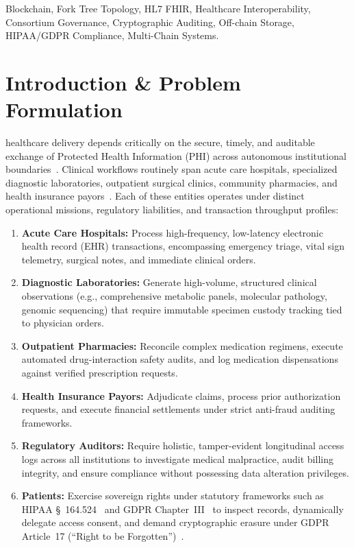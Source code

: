 \documentclass[journal]{IEEEtran}
\theoremstyle{definition}
\begin{document}
\begin{IEEEkeywords}
Blockchain, Fork Tree Topology, HL7 FHIR, Healthcare Interoperability, Consortium Governance, Cryptographic Auditing, Off-chain Storage, HIPAA/GDPR Compliance, Multi-Chain Systems.
\end{IEEEkeywords}

\section{Introduction \& Problem Formulation}
 healthcare delivery depends critically on the secure, timely, and auditable exchange of Protected Health Information (PHI) across autonomous institutional boundaries~\cite{kuo2017blockchain, gordon2018blockchain}. Clinical workflows routinely span acute care hospitals, specialized diagnostic laboratories, outpatient surgical clinics, community pharmacies, and health insurance payors~\cite{mandl2016push, vogel2021interoperability}. Each of these entities operates under distinct operational missions, regulatory liabilities, and transaction throughput profiles:
\begin{enumerate}
    \item \textbf{Acute Care Hospitals:} Process high-frequency, low-latency electronic health record (EHR) transactions, encompassing emergency triage, vital sign telemetry, surgical notes, and immediate clinical orders.
    \item \textbf{Diagnostic Laboratories:} Generate high-volume, structured clinical observations (e.g., comprehensive metabolic panels, molecular pathology, genomic sequencing) that require immutable specimen custody tracking tied to physician orders.
    \item \textbf{Outpatient Pharmacies:} Reconcile complex medication regimens, execute automated drug-interaction safety audits, and log medication dispensations against verified prescription requests.
    \item \textbf{Health Insurance Payors:} Adjudicate claims, process prior authorization requests, and execute financial settlements under strict anti-fraud auditing frameworks.
    \item \textbf{Regulatory Auditors:} Require holistic, tamper-evident longitudinal access logs across all institutions to investigate medical malpractice, audit billing integrity, and ensure compliance without possessing data alteration privileges.
    \item \textbf{Patients:} Exercise sovereign rights under statutory frameworks such as HIPAA \S~164.524~\cite{hipaa1996} and GDPR Chapter~III~\cite{gdpr2016} to inspect records, dynamically delegate access consent, and demand cryptographic erasure under GDPR Article~17 (``Right to be Forgotten'')~\cite{politou2018forgetting, finck2018blockchain}.
\end{enumerate}
\end{document}
